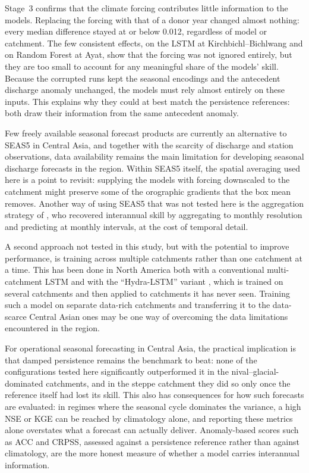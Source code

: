 \documentclass[review,12pt,authoryear]{elsarticle}
\begin{document}
Stage~3 confirms that the climate forcing contributes little information to the models. Replacing the forcing with that of a donor year changed almost nothing: every median difference stayed at or below 0.012, regardless of model or catchment. The few consistent effects, on the LSTM at Kirchbichl--Bichlwang and on Random Forest at Ayat, show that the forcing was not ignored entirely, but they are too small to account for any meaningful share of the models' skill. Because the corrupted runs kept the seasonal encodings and the antecedent discharge anomaly unchanged, the models must rely almost entirely on these inputs. This explains why they could at best match the persistence references: both draw their information from the same antecedent anomaly.

Few freely available seasonal forecast products are currently an alternative to SEAS5 in Central Asia, and together with the scarcity of discharge and station observations, data availability remains the main limitation for developing seasonal discharge forecasts in the region. Within SEAS5 itself, the spatial averaging used here is a point to revisit: supplying the models with forcing downscaled to the catchment might preserve some of the orographic gradients that the box mean removes. Another way of using SEAS5 that was not tested here is the aggregation strategy of \citet{swiftlapointe2025}, who recovered interannual skill by aggregating to monthly resolution and predicting at monthly intervals, at the cost of temporal detail.

A second approach not tested in this study, but with the potential to improve performance, is training across multiple catchments rather than one catchment at a time. This has been done in North America both with a conventional multi-catchment LSTM \citep{kratzert2019} and with the ``Hydra-LSTM'' variant \citep{ruparell2025}, which is trained on several catchments and then applied to catchments it has never seen. Training such a model on separate data-rich catchments and transferring it to the data-scarce Central Asian ones may be one way of overcoming the data limitations encountered in the region.

For operational seasonal forecasting in Central Asia, the practical implication is that damped persistence remains the benchmark to beat: none of the configurations tested here significantly outperformed it in the nival--glacial-dominated catchments, and in the steppe catchment they did so only once the reference itself had lost its skill. This also has consequences for how such forecasts are evaluated: in regimes where the seasonal cycle dominates the variance, a high NSE or KGE can be reached by climatology alone, and reporting these metrics alone overstates what a forecast can actually deliver. Anomaly-based scores such as ACC and CRPSS, assessed against a persistence reference rather than against climatology, are the more honest measure of whether a model carries interannual information.
\end{document}
